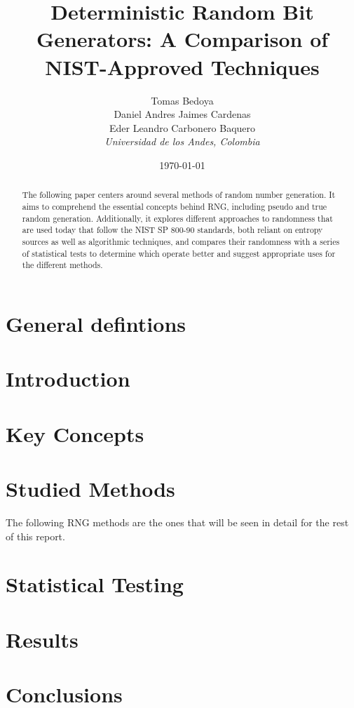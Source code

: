 \documentclass[conference]{IEEEtran}
\title{Deterministic Random Bit Generators: A Comparison of NIST-Approved Techniques}
\author{
    Tomas Bedoya \\
    Daniel Andres Jaimes Cardenas \\
    Eder Leandro Carbonero Baquero \\
    \textit{Universidad de los Andes, Colombia}
}
\date{\today}
\begin{document}
\maketitle
\begin{abstract}
The following paper centers around several methods of random number generation. It aims to comprehend the essential concepts behind RNG, including pseudo and true random generation. Additionally, it explores different approaches to randomness that are used today that follow the NIST SP 800-90 standards, both reliant on entropy sources as well as algorithmic techniques, and compares their randomness with a series of statistical tests to determine which operate better and suggest appropriate uses for the different methods.

\end{abstract}

\section*{General defintions}


\section{Introduction}


\section{Key Concepts}


\section{Studied Methods}
The following RNG methods are the ones that will be seen in detail for the rest of this report.


\section{Statistical Testing}


\section{Results}


\section{Conclusions}

\end{document}
